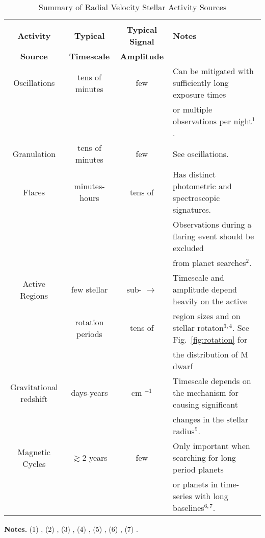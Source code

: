 \begin{table*}
\small
\renewcommand{\arraystretch}{0.7}
\caption{Summary of Radial Velocity Stellar Activity Sources}
\label{table:activity}
\begin{tabular}{cccl}
  \hline \\ [-1ex]
  \textbf{Activity} & \textbf{Typical} & \textbf{Typical Signal} & \textbf{Notes} \\
  \textbf{Source} & \textbf{Timescale} & \textbf{Amplitude} & \\
  \hline
  Oscillations & tens of minutes & few \mps{} & Can be mitigated with sufficiently long exposure times \\
  &&&or multiple observations per night$^1$. \\
  \hline
  Granulation & tens of minutes & few \mps{} & See oscillations.  \\
  \hline
  Flares & minutes-hours & tens of \mps{} & Has distinct photometric and spectroscopic signatures. \\ 
  &&&Observations during a flaring event should be excluded \\
  &&& from planet searches$^2$. \\
  \hline
  Active Regions & few stellar & sub-\mps{} $\to$ & Timescale and amplitude depend heavily on the active \\
  & rotation periods & tens of \mps{} & region sizes and on stellar rotaton$^{3,4}$. See Fig.~\ref{fig:rotation} for \\
  &&& the distribution of M dwarf \prot{.} \\
  \hline
  Gravitational redshift & days-years & cm $^{-1}$ & Timescale depends on the mechanism for causing significant \\
  &&& changes in the stellar radius$^5$. \\
  \hline
  Magnetic Cycles & $\gtrsim 2$ years & few \mps{} & Only important when searching for long period planets \\
  &&& or planets in time-series with long baselines$^{6,7}$.
\end{tabular}
\begin{list}{}{}
\item {\bf{Notes.}}
      (1) \cite{dumusque11a}, (2) \cite{reiners09}, (3) \cite{dumusque11b}, (4) \cite{giles17},
 	(5) \cite{cegla12}, (6) \cite{santos10}, (7) \cite{robertson14}. \\
\end{list}
\end{table*}
